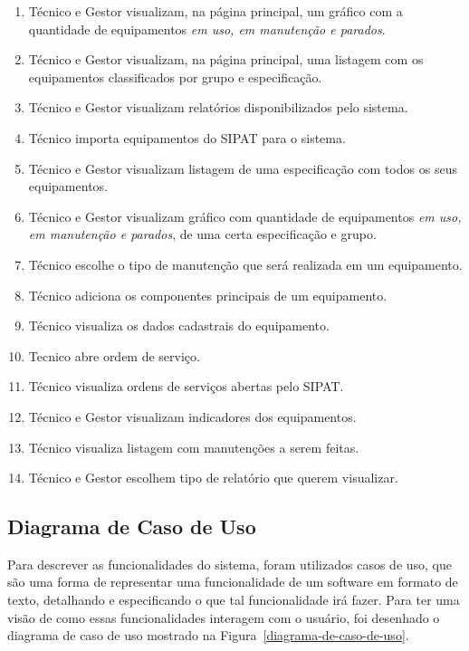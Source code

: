 \begin{enumerate}
	\item Técnico e Gestor visualizam, na página principal, um gráfico com a quantidade de equipamentos \textit{em uso, em manutenção e parados}.
	\item Técnico e Gestor visualizam, na página principal, uma listagem com os equipamentos classificados por grupo e especificação.
	\item Técnico e Gestor visualizam relatórios disponibilizados pelo sistema.
	\item Técnico importa equipamentos do SIPAT para o sistema.
	\item Técnico e Gestor visualizam listagem de uma especificação com todos os seus equipamentos.
	\item Técnico e Gestor visualizam gráfico com quantidade de equipamentos \textit{em uso, em manutenção e parados}, de uma certa especificação e grupo.
	\item Técnico escolhe o tipo de manutenção que será realizada em um equipamento.
	\item Técnico adiciona os componentes principais de um equipamento.
	\item Técnico visualiza os dados cadastrais do equipamento.
	\item Tecnico abre ordem de serviço.
	\item Técnico visualiza ordens de serviços abertas pelo SIPAT.
	\item Técnico  e Gestor visualizam indicadores dos equipamentos.
	\item Técnico visualiza listagem com manutenções a serem feitas.
	\item Técnico e Gestor escolhem tipo de relatório que querem visualizar.
\end{enumerate}


\subsection{Diagrama de Caso de Uso}

Para descrever as funcionalidades do sistema, foram utilizados casos de uso, que são uma forma de representar uma funcionalidade de um software em formato de texto, detalhando e especificando o que tal funcionalidade irá fazer. Para ter uma visão de como essas funcionalidades interagem com o usuário, foi desenhado o diagrama de caso de uso mostrado na Figura~\ref{diagrama-de-caso-de-uso}. 

